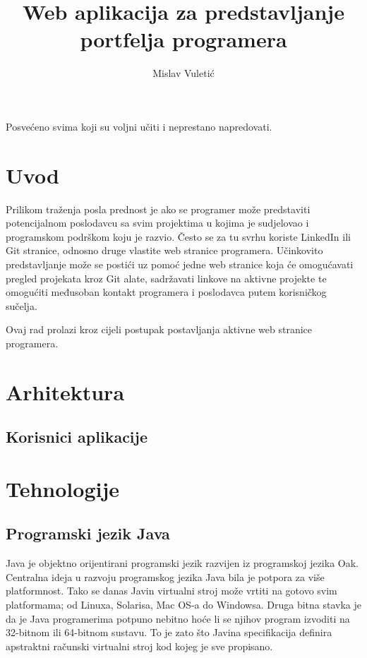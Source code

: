\documentclass[times, utf8, zavrsni, numeric]{fer}
\begin{document}

\title{Web aplikacija za predstavljanje portfelja programera}

\author{Mislav Vuletić}

\maketitle

\zahvala{}
Posvećeno svima koji su voljni učiti i neprestano napredovati.

\tableofcontents

\chapter{Uvod}
\qquad Prilikom traženja posla prednost je ako se programer može predstaviti potencijalnom poslodavcu sa svim projektima u kojima je sudjelovao i programskom podrškom koju je razvio.
Često se za tu svrhu koriste LinkedIn\footnotemark{} ili Git\footnotemark{} stranice, odnosno druge vlastite web stranice programera.
Učinkovito predstavljanje može se postići uz pomoć jedne web stranice koja će omogućavati pregled projekata kroz Git alate, sadržavati linkove na aktivne projekte te omogućiti međusoban kontakt programera i poslodavca putem korisničkog sučelja.

Ovaj rad prolazi kroz cijeli postupak postavljanja aktivne web stranice programera.

\chapter{Arhitektura}
\section{Korisnici aplikacije}

\chapter{Tehnologije}
\section{Programski jezik Java}
\qquad Java je objektno orijentirani programski jezik razvijen iz programskoj jezika Oak\footnotemark{}.
Centralna ideja u razvoju programskog jezika Java bila je potpora za više platformnost.
Tako se danas Javin virtualni stroj može vrtiti na gotovo svim platformama; od Linuxa, Solarisa, Mac OS-a do Windowsa.
Druga bitna stavka je da je Java programerima potpuno nebitno hoće li se njihov program izvoditi na 32-bitnom ili 64-bitnom sustavu.
To je zato što Javina specifikacija definira apstraktni računski virtualni stroj kod kojeg je sve propisano.
\end{document}
